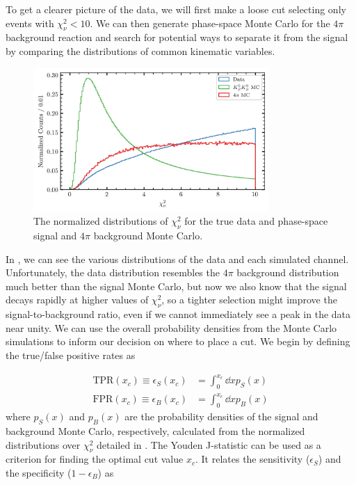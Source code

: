 To get a clearer picture of the data, we will first make a loose cut selecting only events with $\chi^2_\nu < 10$. We can then generate phase-space Monte Carlo for the $4\pi$ background reaction and search for potential ways to separate it from the signal by comparing the distributions of common kinematic variables.

\begin{figure}
  \begin{center}
    \includegraphics[width=0.8\textwidth]{figures/data_combined_chisqdof.png}
  \end{center}
  \caption{The normalized distributions of $\chi^2_\nu$ for the true data and phase-space signal and $4\pi$ background Monte Carlo.}\label{fig:data-combined-chisqdof}
\end{figure}

In , we can see the various distributions of the data and each simulated channel. Unfortunately, the data distribution resembles the $4\pi$ background distribution much better than the signal Monte Carlo, but now we also know that the signal decays rapidly at higher values of $\chi^2_\nu$, so a tighter selection might improve the signal-to-background ratio, even if we cannot immediately see a peak in the data near unity. We can use the overall probability densities from the Monte Carlo simulations to inform our decision on where to place a cut. We begin by defining the true/false positive rates as

\begin{align}
  \text{TPR}(x_c) \equiv \epsilon_S(x_c) &= \int_0^{x_c} \dd{x} p_S(x) \\
  \text{FPR}(x_c) \equiv \epsilon_B(x_c) &= \int_0^{x_c} \dd{x} p_B(x)
\end{align}
where $p_S(x)$ and $p_B(x)$ are the probability densities of the signal and background Monte Carlo, respectively, calculated from the normalized distributions over $\chi^2_\nu$ detailed in . The Youden J-statistic\cite{peirce_numerical_1884,youden_index_1950} can be used as a criterion for finding the optimal cut value $x_c$\cite{schisterman_optimal_2005,powers_evaluation_2020}. It relates the sensitivity ($\epsilon_S$) and the specificity ($1-\epsilon_B$) as

